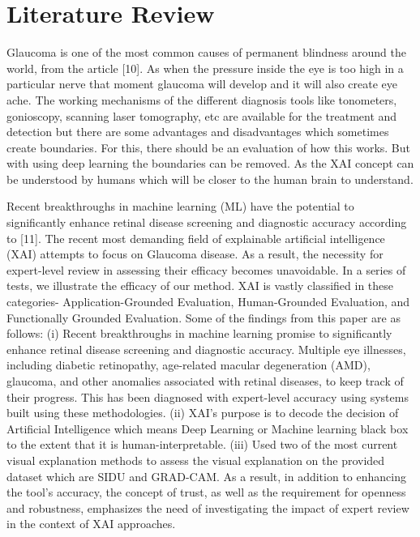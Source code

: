 \section{Literature Review} 
Glaucoma is one of the most common causes of permanent blindness around the world, from the article [10]. As when the pressure inside the eye is too high in a particular nerve that moment glaucoma will develop and it will also create eye ache. The working mechanisms of the different diagnosis tools like tonometers, gonioscopy, scanning laser tomography, etc are available for the treatment and detection but there are some advantages and disadvantages which sometimes create boundaries. For this, there should be an evaluation of how this works. But with using deep learning the boundaries can be removed. As the XAI concept can be understood by humans which will be closer to the human brain to understand.

\vspace{5mm}
Recent breakthroughs in machine learning (ML) have the potential to significantly enhance retinal disease screening and diagnostic accuracy according to [11]. The recent most demanding field of explainable artificial intelligence (XAI) attempts to focus on Glaucoma disease. As a result, the necessity for expert-level review in assessing their efficacy becomes unavoidable. In a series of tests, we illustrate the efficacy of our method. XAI is vastly classified in these categories- Application-Grounded Evaluation, Human-Grounded Evaluation, and Functionally Grounded Evaluation. Some of the findings from this paper are as follows: (i) Recent breakthroughs in machine learning promise to significantly enhance retinal disease screening and diagnostic accuracy. Multiple eye illnesses, including diabetic retinopathy, age-related macular degeneration (AMD), glaucoma, and other anomalies associated with retinal diseases, to keep track of their progress. This has been diagnosed with expert-level accuracy using systems built using these methodologies. (ii) XAI's purpose is to decode the decision of Artificial Intelligence which means Deep Learning or Machine learning black box to the extent that it is human-interpretable. (iii) Used two of the most current visual explanation methods to assess the visual explanation on the provided dataset which are SIDU and GRAD-CAM. As a result, in addition to enhancing the tool's accuracy, the concept of trust, as well as the requirement for openness and robustness, emphasizes the need of investigating the impact of expert review in the context of XAI approaches.

